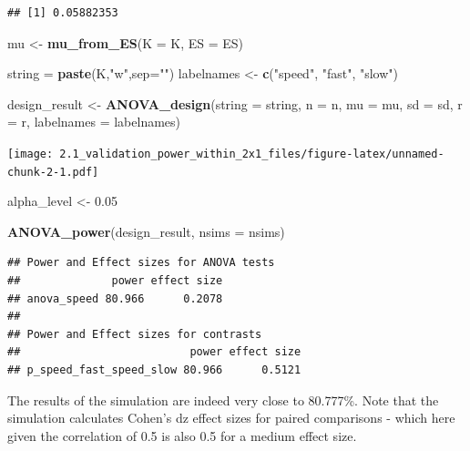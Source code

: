 \documentclass[]{article}
\newenvironment{Shaded}{\begin{snugshade}}{\end{snugshade}}
\newcommand{\KeywordTok}[1]{\textcolor[rgb]{0.13,0.29,0.53}{\textbf{#1}}}
\newcommand{\DataTypeTok}[1]{\textcolor[rgb]{0.13,0.29,0.53}{#1}}
\newcommand{\FloatTok}[1]{\textcolor[rgb]{0.00,0.00,0.81}{#1}}
\newcommand{\StringTok}[1]{\textcolor[rgb]{0.31,0.60,0.02}{#1}}
\newcommand{\NormalTok}[1]{#1}
\begin{document}
\begin{verbatim}
## [1] 0.05882353
\end{verbatim}

\begin{Shaded}
\begin{Highlighting}[]
\NormalTok{mu <-}\StringTok{ }\KeywordTok{mu_from_ES}\NormalTok{(}\DataTypeTok{K =}\NormalTok{ K, }\DataTypeTok{ES =}\NormalTok{ ES)}

\NormalTok{string =}\StringTok{ }\KeywordTok{paste}\NormalTok{(K,}\StringTok{"w"}\NormalTok{,}\DataTypeTok{sep=}\StringTok{""}\NormalTok{)}
\NormalTok{labelnames <-}\StringTok{ }\KeywordTok{c}\NormalTok{(}\StringTok{"speed"}\NormalTok{, }\StringTok{"fast"}\NormalTok{, }\StringTok{"slow"}\NormalTok{)}

\NormalTok{design_result <-}\StringTok{ }\KeywordTok{ANOVA_design}\NormalTok{(}\DataTypeTok{string =}\NormalTok{ string,}
                   \DataTypeTok{n =}\NormalTok{ n, }
                   \DataTypeTok{mu =}\NormalTok{ mu, }
                   \DataTypeTok{sd =}\NormalTok{ sd, }
                   \DataTypeTok{r =}\NormalTok{ r, }
                   \DataTypeTok{labelnames =}\NormalTok{ labelnames)}
\end{Highlighting}
\end{Shaded}

\texttt{[image: 2.1\_validation\_power\_within\_2x1\_files/figure-latex/unnamed-chunk-2-1.pdf]}

\begin{Shaded}
\begin{Highlighting}[]
\NormalTok{alpha_level <-}\StringTok{ }\FloatTok{0.05}

\KeywordTok{ANOVA_power}\NormalTok{(design_result, }\DataTypeTok{nsims =}\NormalTok{ nsims)}
\end{Highlighting}
\end{Shaded}

\begin{verbatim}
## Power and Effect sizes for ANOVA tests
##              power effect size
## anova_speed 80.966      0.2078
## 
## Power and Effect sizes for contrasts
##                          power effect size
## p_speed_fast_speed_slow 80.966      0.5121
\end{verbatim}

The results of the simulation are indeed very close to 80.777\%. Note
that the simulation calculates Cohen's dz effect sizes for paired
comparisons - which here given the correlation of 0.5 is also 0.5 for a
medium effect size.
\end{document}
